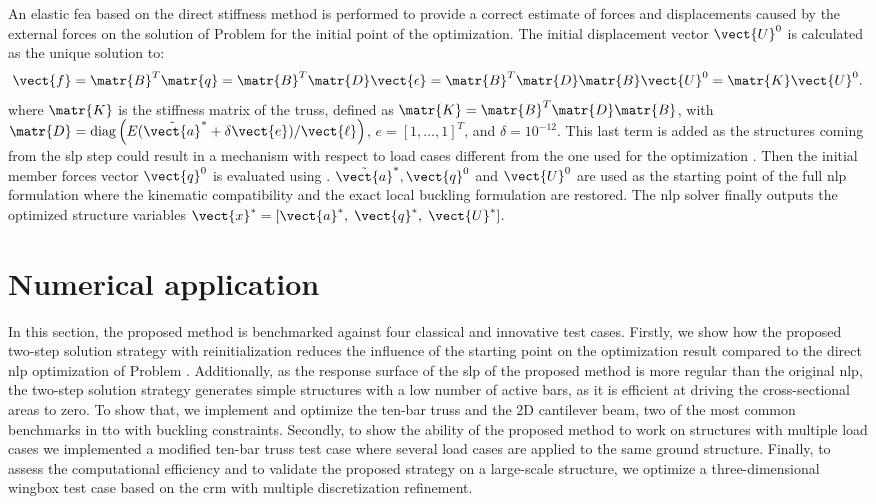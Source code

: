 An elastic \gls{fea} based on the direct stiffness method is performed to provide a correct estimate of forces and displacements caused by the external forces on the solution of Problem  for the initial point of the optimization. The initial displacement vector $\vect{U}^0$ is calculated as the unique solution to:
\begin{equation}
    \vect{f}=\matr{B}^T \matr{q}=\matr{B}^{T} \matr{D} \vect{\epsilon}=\matr{B}^{T} \matr{D} \matr{B} \vect{U}^0=\matr{K} \vect{U}^0.
    \label{eq:04_truss_fem}
\end{equation} 
 where $\matr{K}$ is the stiffness matrix of the truss, defined as $\matr{K}=\matr{B}^{T} \matr{D} \matr{B}$, with $\matr{D}=\operatorname{diag}\left(E (\tilde{\vect{a}}^* + \delta \vect{e}) / \vect{\ell}\right)$, $e =[1,\dots,1]^T$, and $\delta =10^{-12}$. This last term is added as the structures coming from the \gls{slp} step could result in a mechanism with respect to load cases different from the one used for the optimization . Then the initial member forces vector $\vect{q}^0$ is evaluated using . $\tilde{\vect{a}}^*, \vect{q}^0$ and $\vect{U}^0$ are used as the starting point of the full \gls{nlp} formulation where the kinematic compatibility and the exact local buckling formulation are restored. The \gls{nlp} solver finally outputs the optimized structure variables $\vect{x}^*=[\vect{a}^*,\; \vect{q}^*,\; \vect{U}^*]$.

\section{Numerical application} \label{sec:04_numerical_app}
In this section, the proposed method is benchmarked against four classical and innovative test cases. Firstly, we show how the proposed two-step solution strategy with reinitialization reduces the influence of the starting point on the optimization result compared to the direct \gls{nlp} optimization of Problem . Additionally, as the response surface of the \gls{slp} of the proposed method is more regular than the original \gls{nlp}, the two-step solution strategy generates simple structures \ie with a low number of active bars, as it is efficient at driving the cross-sectional areas to zero. To show that, we implement and optimize the ten-bar truss and the 2D cantilever beam, two of the most common benchmarks in \gls{tto} with buckling constraints. Secondly, to show the ability of the proposed method to work on structures with multiple load cases we implemented a modified ten-bar truss test case where several load cases are applied to the same ground structure. Finally, to assess the computational efficiency and to validate the proposed strategy on a large-scale structure, we optimize a three-dimensional wingbox test case based on the \acrfull{crm} with multiple discretization refinement.

